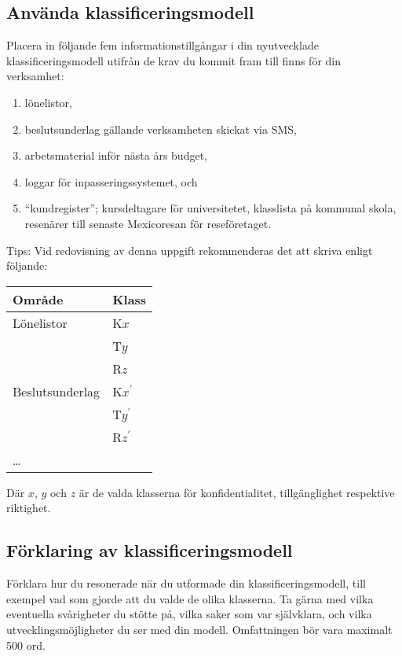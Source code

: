 \documentclass[a4paper]{llncs}
\begin{document}
\subsection{Använda klassificeringsmodell}
\label{sec:use}
\noindent
Placera in följande fem informationstillgångar i din nyutvecklade 
klassificeringsmodell utifrån de krav du kommit fram till finns för din 
verksamhet:
\begin{enumerate}
  \item lönelistor,
  \item beslutsunderlag gällande verksamheten skickat via SMS,
  \item arbetsmaterial inför nästa års budget,
  \item loggar för inpasseringssystemet, och
  \item \enquote{kundregister}; kursdeltagare för universitetet, klasslista på 
    kommunal skola, resenärer till senaste Mexicoresan för reseföretaget.
\end{enumerate}
\begin{framed}\noindent
  Tips: Vid redovisning av denna uppgift rekommenderas det att skriva enligt 
  följande:
  \begin{center}
    \begin{tabular}{ll}
      \textbf{Område} & \textbf{Klass} \\
      \toprule
      Lönelistor  & K\(x\) \\
                  & T\(y\) \\
                  & R\(z\) \\
      \midrule
      Beslutsunderlag & K\(x^\prime\) \\
                      & T\(y^\prime\) \\
                      & R\(z^\prime\) \\
      \midrule
      \dots \\
      \bottomrule
    \end{tabular}
  \end{center}
  Där \(x\), \(y\) och \(z\) är de valda klasserna för konfidentialitet, 
  tillgänglighet respektive riktighet.
\end{framed}

\subsection{Förklaring av klassificeringsmodell}
\label{sec:explanation}
\noindent
Förklara hur du resonerade när du utformade din klassificeringsmodell, till 
exempel vad som gjorde att du valde de olika klasserna.
Ta gärna med vilka eventuella svårigheter du stötte på, vilka saker som var 
självklara, och vilka utvecklingsmöjligheter du ser med din modell.
Omfattningen bör vara maximalt 500 ord.
\end{document}
